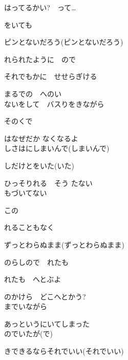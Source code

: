 はってるかい?　って…

をいても

ピンとないだろう(ピンとないだろう)

れられたように　ので

それでもかに　せせらぎける

まるでの　へのい
\\

ないをして　バスりをきながら

 そのくで

はなぜだか なくなるよ
\\

しさはにしまいんで(しまいんで)

しだけとをいた(いた)

ひっそりれる　そう たない
\\

もづいてない

この

れることもなく

ずっとわらぬまま(ずっとわらぬまま)

のらしので　れたも

れたも　へとぶよ

のかけら　どこへとかう?
\\

までいながら

あっというにいてしまった
\\

のでいたが(で)

きできるならそれでいい(それでいい)


